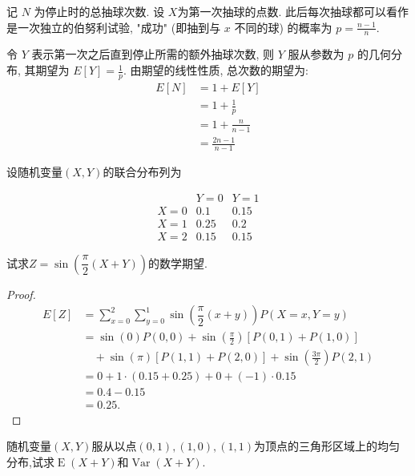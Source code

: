 \documentclass[../main.tex]{subfiles}
\begin{document}
\begin{solution}

记 \(N\) 为停止时的总抽球次数. 设 \(  X  \)为第一次抽球的点数.    此后每次抽球都可以看作是一次独立的伯努利试验, "成功" (即抽到与 \(x\) 不同的球) 的概率为 \(p = \frac{n-1}{n}\).

令 \(Y\) 表示第一次之后直到停止所需的额外抽球次数, 则 \(Y\) 服从参数为 \(p\) 的几何分布, 其期望为 \(E[Y] = \frac{1}{p}\).
由期望的线性性质, 总次数的期望为:
\[
\begin{aligned}
E[N] &= 1 + E[Y] \\
&= 1 + \frac{1}{p} \\
&= 1 + \frac{n}{n-1} \\
&= \frac{2n-1}{n-1}
\end{aligned}
\]
\end{solution}


\begin{exercise}{}{}
设随机变量\((X,Y)\)的联合分布列为

\[
\begin{array}{c|cc}
 & Y=0 & Y=1 \\
\hline
X=0 & 0.1 & 0.15 \\
X=1 & 0.25 & 0.2 \\
X=2 & 0.15 & 0.15
\end{array}
\]

试求\(Z=\sin\!\left(\dfrac{\pi}{2}(X+Y)\right)\)的数学期望.
\end{exercise}
\begin{proof}
  
$$\begin{aligned}
E[Z] &= \sum_{x=0}^{2}\sum_{y=0}^{1} \sin\!\left(\dfrac{\pi}{2}(x+y)\right) P(X=x, Y=y) \\
&= \sin(0)P(0,0) + \sin\left(\frac{\pi}{2}\right)[P(0,1)+P(1,0)] \\
&\quad + \sin(\pi)[P(1,1)+P(2,0)] + \sin\left(\frac{3\pi}{2}\right)P(2,1) \\
&= 0 + 1 \cdot (0.15 + 0.25) + 0 + (-1) \cdot 0.15 \\
&= 0.4 - 0.15 \\
&= 0.25.
\end{aligned}$$
\end{proof}
\begin{exercise}{}{}
随机变量\((X,Y)\)服从以点\((0,1),(1,0),(1,1)\)为顶点的三角形区域上的均匀分布,试求\(\operatorname{E}(X+Y)\)和\(\operatorname{Var}(X+Y)\).
\end{exercise}
\end{document}
